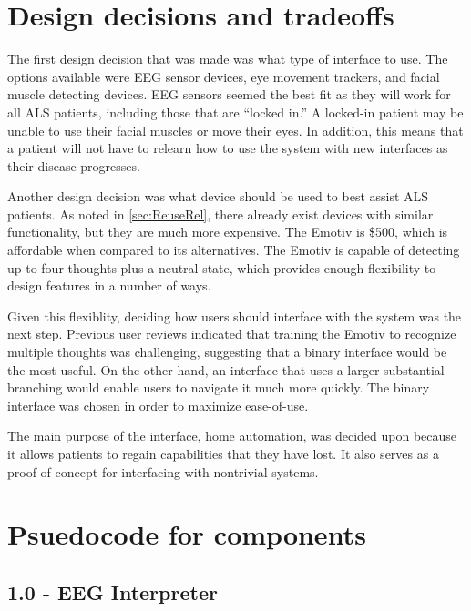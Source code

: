 \documentclass{article}
\begin{document}
\section{Design decisions and tradeoffs}

The first design decision that was made was what type of interface to use.
The options available were EEG sensor devices, eye movement trackers, and
facial muscle detecting devices. EEG sensors seemed the best fit as they
will work for all ALS patients, including those that are ``locked in.'' A
locked-in patient may be unable to use their facial muscles or move their
eyes. In addition, this means that a patient will not have to relearn how to
use the system with new interfaces as their disease progresses.

Another design decision was what device should be used to best assist ALS
patients. As noted in \autoref{sec:ReuseRel}, there already exist devices with
similar functionality, but they are much more expensive. The Emotiv is \$500,
which is affordable when compared to its alternatives. The Emotiv is capable
of detecting up to four thoughts plus a neutral state, which provides enough
flexibility to design features in a number of ways.

Given this flexiblity, deciding how users should interface with the system was
the next step. Previous user reviews indicated that training the Emotiv to
recognize multiple thoughts was challenging, suggesting that a binary
interface would be the most useful. On the other hand, an interface that uses
a larger substantial branching would enable users to navigate it much more
quickly. The binary interface was chosen in order to maximize ease-of-use.

The main purpose of the interface, home automation, was decided upon because
it allows patients to regain capabilities that they have lost. It also
serves as a proof of concept for interfacing with nontrivial systems.

\newpage

\section{Psuedocode for components}

\subsection*{1.0 - EEG Interpreter}
\end{document}
